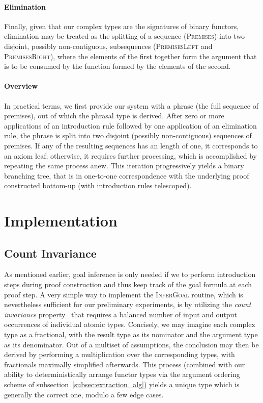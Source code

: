 \paragraph{Elimination}
Finally, given that our complex types are the signatures of binary functors, elimination may be treated as the splitting of a sequence (\textsc{Premises}) into two disjoint, possibly non-contiguous, subsequences (\textsc{PremisesLeft} and \textsc{PremisesRight}), where the elements of the first together form the argument that is to be consumed by the function formed by the elements of the second.

\paragraph{Overview}
In practical terms, we first provide our system with a phrase (the full sequence of premises), out of which the phrasal type is derived.
After zero or more applications of an introduction rule followed by one application of an elimination rule, the phrase is split into two disjoint (possibly non-contiguous) sequences of premises.
If any of the resulting sequences has an length of one, it corresponds to an axiom leaf; otherwise, it requires further processing, which is accomplished by repeating the same process anew.
This iteration progressively yields a binary branching tree, that is in one-to-one correspondence with the underlying proof constructed bottom-up (with introduction rules telescoped).

\section{Implementation}
\subsection{Count Invariance}
As mentioned earlier, goal inference is only needed if we to perform introduction steps during proof construction and thus keep track of the goal formula at each proof step.
A very simple way to implement the \textsc{InferGoal} routine, which is nevertheless sufficient for our preliminary experiments, is by utilizing the  \emph{count invariance} property~\cite{DBLP:journals/jphil/Benthem91} that requires a balanced number of input and output occurrences of individual atomic types.
Concisely, we may imagine each complex type as a fractional, with the result type as its nominator and the argument type as its denominator.
Out of a multiset of assumptions, the conclusion may then be derived by performing a multiplication over the corresponding types, with fractionals maximally simplified afterwards.
This process (combined with our ability to deterministically arrange functor types via the argument ordering scheme of subsection~\ref{subsec:extraction_alg}) yields a unique type which is generally the correct one, modulo a few edge cases.

